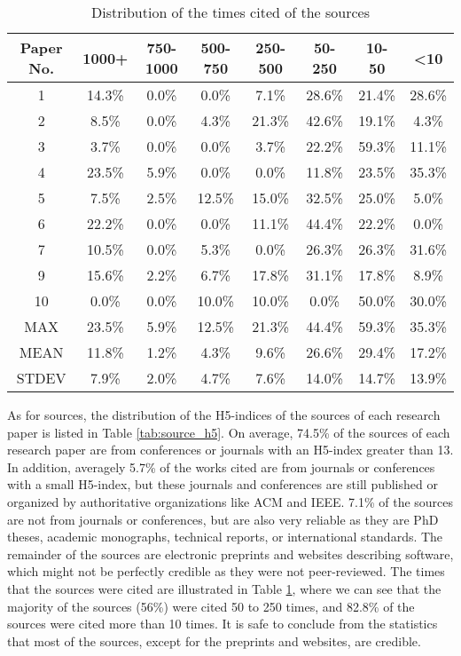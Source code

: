 \begin{table}[htb]
    \caption{Distribution of the times cited of the sources}
    \centering
      \begin{tabular}{cccccccc}
        \toprule[1.5pt]
        \textbf{Paper No.} & \textbf{1000+} & \textbf{750-1000} & \textbf{500-750} & \textbf{250-500} & \textbf{50-250} & \textbf{10-50} & \textbf{<10} \\
        \midrule[1pt]
        1 & 14.3\% & 0.0\% & 0.0\% & 7.1\% & 28.6\% & 21.4\% & 28.6\%\\
        2 & 8.5\% & 0.0\% & 4.3\% & 21.3\% & 42.6\% & 19.1\% & 4.3\%\\
        3 & 3.7\% & 0.0\% & 0.0\% & 3.7\% & 22.2\% & 59.3\% & 11.1\%\\
        4 & 23.5\% & 5.9\% & 0.0\% & 0.0\% & 11.8\% & 23.5\% & 35.3\%\\
        5 & 7.5\% & 2.5\% & 12.5\% & 15.0\% & 32.5\% & 25.0\% & 5.0\%\\
        6 & 22.2\% & 0.0\% & 0.0\% & 11.1\% & 44.4\% & 22.2\% & 0.0\%\\
        7 & 10.5\% & 0.0\% & 5.3\% & 0.0\% & 26.3\% & 26.3\% & 31.6\%\\
        9 & 15.6\% & 2.2\% & 6.7\% & 17.8\% & 31.1\% & 17.8\% & 8.9\%\\
        10 & 0.0\% & 0.0\% & 10.0\% & 10.0\% & 0.0\% & 50.0\% & 30.0\%\\
        MAX & 23.5\% & 5.9\% & 12.5\% & 21.3\% & 44.4\% & 59.3\% & 35.3\%\\
        MEAN & 11.8\% & 1.2\% & 4.3\% & 9.6\% & 26.6\% & 29.4\% & 17.2\%\\
        STDEV & 7.9\% & 2.0\% & 4.7\% & 7.6\% & 14.0\% & 14.7\% & 13.9\%\\
      \bottomrule[1.5pt]
    \end{tabular}
    \label{tab:source_times_cited}
  \end{table}

As for sources, the distribution of the H5-indices of the sources of each research paper is listed in Table \ref{tab:source_h5}. On average, 74.5\% of the sources of each research paper are from conferences or journals with an H5-index greater than 13. In addition, averagely 5.7\% of the works cited are from journals or conferences with a small H5-index, but these journals and conferences are still published or organized by authoritative organizations like ACM and IEEE. 7.1\% of the sources are not from journals or conferences, but are also very reliable as they are PhD theses, academic monographs, technical reports, or international standards. The remainder of the sources are electronic preprints and websites describing software, which might not be perfectly credible as they were not peer-reviewed. The times that the sources were cited are illustrated in Table \ref{tab:source_times_cited}, where we can see that the majority of the sources (56\%) were cited 50 to 250 times, and 82.8\% of the sources were cited more than 10 times. It is safe to conclude from the statistics that most of the sources, except for the preprints and websites, are credible.

